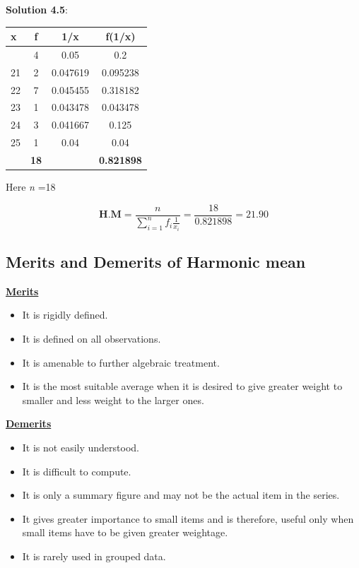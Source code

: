 \documentclass[
]{book}
\begin{document}
\textbf{Solution 4.5}:

\begin{longtable}[]{@{}lccc@{}}
\toprule\noalign{}
x & f & 1/x & f(1/x) \\
\midrule\noalign{}
\endhead
\bottomrule\noalign{}
\endlastfoot
20 & 4 & 0.05 & 0.2 \\
21 & 2 & 0.047619 & 0.095238 \\
22 & 7 & 0.045455 & 0.318182 \\
23 & 1 & 0.043478 & 0.043478 \\
24 & 3 & 0.041667 & 0.125 \\
25 & 1 & 0.04 & 0.04 \\
& \textbf{18} & & \textbf{0.821898} \\
\end{longtable}

Here \emph{n} =18

\[\mathbf{\text{H.M}} = \frac{n}{\sum_{i = 1}^{n}{f_{i}\frac{1}{x_{i}}}} = \frac{18}{0.821898} = 21.90\]

\subsection{Merits and Demerits of Harmonic mean}\label{merits-and-demerits-of-harmonic-mean}

\ul{\textbf{Merits}}

\begin{itemize}
\item
  It is rigidly defined.
\item
  It is defined on all observations.
\item
  It is amenable to further algebraic treatment.
\item
  It is the most suitable average when it is desired to give greater
  weight to smaller and less weight to the larger ones.
\end{itemize}

\ul{\textbf{Demerits}}

\begin{itemize}
\item
  It is not easily understood.
\item
  It is difficult to compute.
\item
  It is only a summary figure and may not be the actual item in the
  series.
\item
  It gives greater importance to small items and is therefore, useful
  only when small items have to be given greater weightage.
\item
  It is rarely used in grouped data.
\end{itemize}
\end{document}
